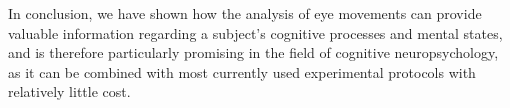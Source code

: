 \documentclass[11pt]{article}
\newcommand{\myreferences}{/Users/matteo/Documents/My\ Library.bib}
\begin{document}
In conclusion, we have shown how the analysis of eye movements can provide valuable information regarding a subject's cognitive processes and mental states, and is therefore particularly promising in the field of cognitive neuropsychology, as it can be combined with most currently used experimental protocols with relatively little cost.



\end{document}
